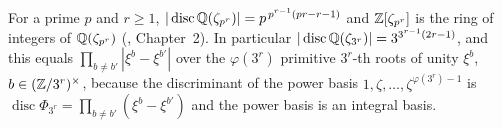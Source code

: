 For a prime $p$ and $r\ge1$, $|\operatorname{disc}\mathbb{Q}(\zeta_{p^r})|=p^{\,p^{r-1}(pr-r-1)}$ and $\mathbb{Z}[\zeta_{p^r}]$ is the ring of integers of $\mathbb{Q}(\zeta_{p^r})$ (\cite{Wash}, Chapter~2). In particular $|\operatorname{disc}\mathbb{Q}(\zeta_{3^r})|=3^{3^{r-1}(2r-1)}$, and this equals $\prod_{b\ne b'}|\xi^{b}-\xi^{b'}|$ over the $\varphi(3^r)$ primitive $3^r$-th roots of unity $\xi^b$, $b\in(\mathbb{Z}/3^r)^\times$, because the discriminant of the power basis $1,\zeta,\dots,\zeta^{\varphi(3^r)-1}$ is $\operatorname{disc}\Phi_{3^r}=\prod_{b\ne b'}(\xi^b-\xi^{b'})$ and the power basis is an integral basis.
